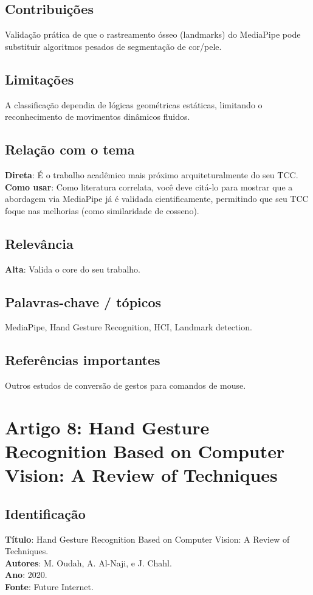 \documentclass[12pt, a4paper]{article}
\begin{document}
\subsection{Contribuições}
Validação prática de que o rastreamento ósseo (landmarks) do MediaPipe pode substituir algoritmos pesados de segmentação de cor/pele.\\
\subsection{Limitações}
A classificação dependia de lógicas geométricas estáticas, limitando o reconhecimento de movimentos dinâmicos fluidos.\\
\subsection{Relação com o tema}
\textbf{Direta}: É o trabalho acadêmico mais próximo arquiteturalmente do seu TCC.\\
\textbf{Como usar}: Como literatura correlata, você deve citá-lo para mostrar que a abordagem via MediaPipe já é validada cientificamente, permitindo que seu TCC foque nas melhorias (como similaridade de cosseno).\\
\subsection{Relevância}
\textbf{Alta}: Valida o core do seu trabalho.\\
\subsection{Palavras-chave / tópicos}
MediaPipe, Hand Gesture Recognition, HCI, Landmark detection.\\
\subsection{Referências importantes}
Outros estudos de conversão de gestos para comandos de mouse.
\newpage

\section{Artigo 8: Hand Gesture Recognition Based on Computer Vision: A Review of Techniques}
\subsection{Identificação}
\textbf{Título}: Hand Gesture Recognition Based on Computer Vision: A Review of Techniques.\\
\textbf{Autores}: M. Oudah, A. Al-Naji, e J. Chahl.\\
\textbf{Ano}: 2020.\\
\textbf{Fonte}: Future Internet.\\
\end{document}
